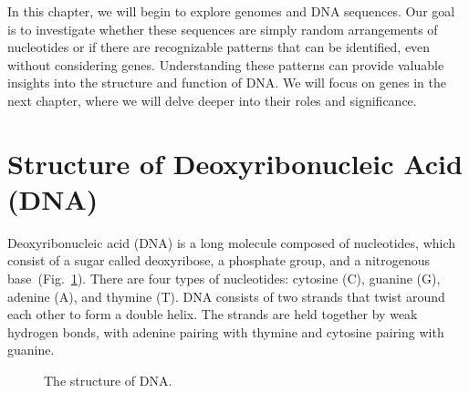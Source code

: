 In this chapter, we will begin to explore genomes and DNA sequences.
Our goal is to investigate whether these sequences are simply random arrangements of nucleotides or if there are recognizable patterns that can be identified, even without considering genes. Understanding these patterns can provide valuable insights into the structure and function of DNA. We will focus on genes in the next chapter, where we will delve deeper into their roles and significance.

\section{Structure of Deoxyribonucleic Acid (DNA)}

Deoxyribonucleic acid (DNA) is a long molecule composed of nucleotides, which consist of a sugar called deoxyribose, a phosphate group, and a nitrogenous base~(Fig.~\ref{fig:g-dna-detail}). There are four types of nucleotides: cytosine (C), guanine (G), adenine (A), and thymine (T). DNA consists of two strands that twist around each other to form a double helix. The strands are held together by weak hydrogen bonds, with adenine pairing with thymine and cytosine pairing with guanine.

\begin{figure}
    \caption[6pt]{The structure of DNA.}
    \label{fig:g-dna-detail}
  \end{figure}

